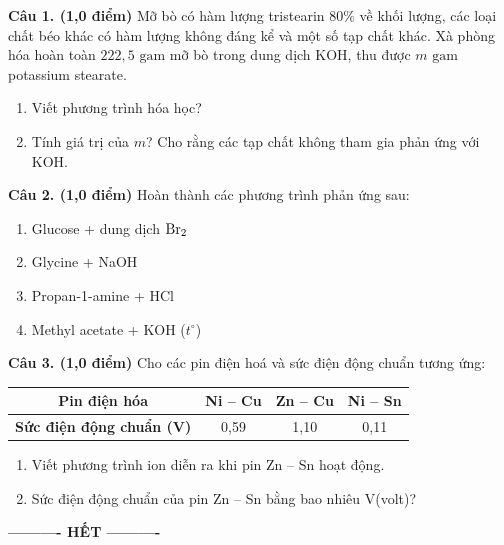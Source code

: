 \documentclass[11pt,a4paper]{article}
\begin{document}
\noindent
\textbf{Câu 1. (1,0 điểm)} Mỡ bò có hàm lượng tristearin $80\%$ về khối lượng, các loại chất béo khác có hàm lượng không đáng kể và một số tạp chất khác. Xà phòng hóa hoàn toàn $222,5\text{ gam}$ mỡ bò trong dung dịch KOH, thu được $m\text{ gam}$ potassium stearate.
\begin{enumerate}[label=\alph*),leftmargin=20pt,itemsep=1pt]
\item Viết phương trình hóa học?
\item Tính giá trị của $m$? Cho rằng các tạp chất không tham gia phản ứng với KOH.
\end{enumerate}

\vspace{1pt}
\noindent
{}

\vspace{2pt}
\noindent
\textbf{Câu 2. (1,0 điểm)} Hoàn thành các phương trình phản ứng sau:
\begin{enumerate}[label=\alph*),leftmargin=20pt,itemsep=1pt]
\item Glucose + dung dịch $\ce{Br2}$
\item Glycine + NaOH
\item Propan-1-amine + HCl
\item Methyl acetate + KOH ($t^\circ$)
\end{enumerate}

\vspace{1pt}
\noindent
{}

\vspace{2pt}
\noindent
\textbf{Câu 3. (1,0 điểm)} Cho các pin điện hoá và sức điện động chuẩn tương ứng:
\begin{center}
\renewcommand{\arraystretch}{1.2}
\begin{tabular}{|c|c|c|c|}
\hline
\rowcolor{tableGreen}
\textbf{Pin điện hóa} & \textbf{Ni -- Cu} & \textbf{Zn -- Cu} & \textbf{Ni -- Sn} \\
\hline
\textbf{Sức điện động chuẩn (V)} & 0,59 & 1,10 & 0,11 \\
\hline
\end{tabular}
\end{center}
\begin{enumerate}[label=\alph*),leftmargin=20pt,itemsep=1pt]
\item Viết phương trình ion diễn ra khi pin Zn -- Sn hoạt động.
\item Sức điện động chuẩn của pin Zn -- Sn bằng bao nhiêu V(volt)?
\end{enumerate}

\vspace{1pt}
\noindent
{}

\vfill
\begin{center}
\textbf{---------- HẾT ----------}
\end{center}
\end{document}
